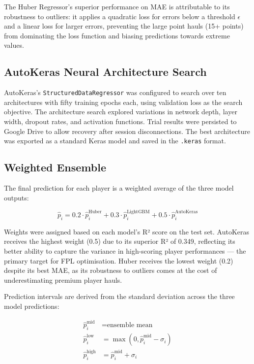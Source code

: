 \documentclass[11pt,english,listoffigures,listoftables]{tfgetsinf}
\begin{document}
The Huber Regressor's superior performance on MAE is attributable to its robustness to outliers: it applies a quadratic loss for errors below a threshold $\epsilon$ and a linear loss for larger errors, preventing the large point hauls (15+ points) from dominating the loss function and biasing predictions towards extreme values.

\subsection{AutoKeras Neural Architecture Search}

AutoKeras's \texttt{StructuredDataRegressor} was configured to search over ten architectures with fifty training epochs each, using validation loss as the search objective. The architecture search explored variations in network depth, layer width, dropout rates, and activation functions. Trial results were persisted to Google Drive to allow recovery after session disconnections. The best architecture was exported as a standard Keras model and saved in the \texttt{.keras} format.

\subsection{Weighted Ensemble}

The final prediction for each player is a weighted average of the three model outputs:

\begin{equation}
\hat{p}_i = 0.2 \cdot \hat{p}_i^{\text{Huber}} + 0.3 \cdot \hat{p}_i^{\text{LightGBM}} + 0.5 \cdot \hat{p}_i^{\text{AutoKeras}}
\end{equation}

Weights were assigned based on each model's R² score on the test set. AutoKeras receives the highest weight (0.5) due to its superior R² of 0.349, reflecting its better ability to capture the variance in high-scoring player performances --- the primary target for FPL optimisation. Huber receives the lowest weight (0.2) despite its best MAE, as its robustness to outliers comes at the cost of underestimating premium player hauls.

Prediction intervals are derived from the standard deviation across the three model predictions:

\begin{align}
\hat{p}_i^{\text{mid}} &= \text{ensemble mean} \\
\hat{p}_i^{\text{low}} &= \max(0, \hat{p}_i^{\text{mid}} - \sigma_i) \\
\hat{p}_i^{\text{high}} &= \hat{p}_i^{\text{mid}} + \sigma_i
\end{align}
\end{document}
